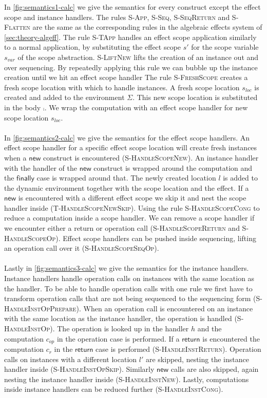 {In \cref{fig:semantics1-calc} we give the semantics for every construct except the effect scope and instance handlers.
The rules \textsc{S-App}, \textsc{S-Seq}, \textsc{S-SeqReturn} and \textsc{S-Flatten} are the same as the corresponding rules in the
algebraic effects system of \cref{sec:theory-algeff}.
The rule \textsc{S-TApp} handles an effect scope application similarly to a normal application, by substituting the effect scope $s'$ for the scope variable $s_{var}$ of the scope abstraction.
\textsc{S-LiftNew} lifts the creation of an instance out and over sequencing.
By repeatedly applying this rule we can bubble up the instance creation until we hit an effect scope handler
The rule \textsc{S-FreshScope} creates a fresh scope location with which to handle instances.
A fresh scope location $s_{loc}$ is created and added to the environment $\Sigma$.
This new scope location is substituted in the body $\comp$.
We wrap the computation with an effect scope handler for new scope location $s_{loc}$.
\\\\
In \cref{fig:semantics2-calc} we give the semantics for the effect scope handlers.
An effect scope handler for a specific effect scope location will create fresh instances when a $\mathsf{new}$ construct is encountered (\textsc{S-HandleScopeNew}).
An instance handler with the handler of the $\mathsf{new}$ construct is wrapped around the computation and the $\mathsf{finally}$ case is wrapped around that.
The newly created location $l$ is added to the dynamic environment together with the scope location and the effect.
If a $\mathsf{new}$ is encountered with a different effect scope we skip it and nest the scope handler inside (\textsc{T-HandleScopeNewSkip}).
Using the rule \textsc{S-HandleScopeCong} to reduce a computation inside a scope handler.
We can remove a scope handler if we encounter either a return or operation call (\textsc{S-HandleScopeReturn} and \textsc{S-HandleScopeOp}).
Effect scope handlers can be pushed inside sequencing, lifting an operation call over it (\textsc{S-HandleScopeSeqOp}).
\\\\
Lastly in \cref{fig:semantics3-calc} we give the semantics for the instance handlers.
Instance handlers handle operation calls on instances with the same location as the handler.
To be able to handle operation calls with one rule we first have to transform operation calls that are not being sequenced to the sequencing form (\textsc{S-HandleInstOpPrepare}).
When an operation call is encountered on an instance with the same location as the instance handler, the operation is handled (\textsc{S-HandleInstOp}).
The operation is looked up in the handler $h$ and the computation $c_{op}$ in the operation case is performed.
If a $\mathsf{return}$ is encountered the computation $c_r$ in the $\mathsf{return}$ case is performed (\textsc{S-HandleInstReturn}).
Operation calls on instances with a different location $l'$ are skipped, nesting the instance handler inside (\textsc{S-HandleInstOpSkip}).
Similarly $\mathsf{new}$ calls are also skipped, again nesting the instance handler inside (\textsc{S-HandleInstNew}).
Lastly, computations inside instance handlers can be reduced further (\textsc{S-HandleInstCong}).

}
